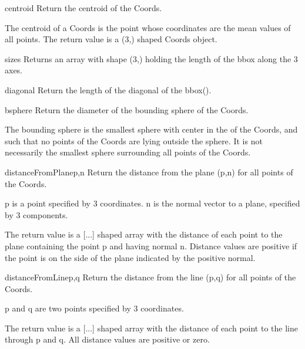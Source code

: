 \begin{methoddesc}{centroid}{}
Return the centroid of the Coords.

        The centroid of a Coords is the point whose coordinates
        are the mean values of all points.
        The return value is a (3,) shaped Coords object.\end{methoddesc}

\begin{methoddesc}{sizes}{}
Returns an array with shape (3,) holding the length of the bbox along the 3 axes.
\end{methoddesc}

\begin{methoddesc}{diagonal}{}
Return the length of the diagonal of the bbox().
\end{methoddesc}

\begin{methoddesc}{bsphere}{}
Return the diameter of the bounding sphere of the Coords.

The bounding sphere is the smallest sphere with center in the  of the Coords, and such that no points of the Coords are lying outside the sphere. It is not necessarily the smallest sphere surrounding all points of the Coords.
\end{methoddesc}


\begin{methoddesc}{distanceFromPlane}{p,n}
    Return the distance from the plane (p,n) for all points of the Coords.

    p is a point specified by 3 coordinates.
    n is the normal vector to a plane, specified by 3 components.

    The return value is a [...] shaped array with the distance of
    each point to the plane containing the point  p and having normal n.
    Distance values are positive if the point is on the side of the
    plane indicated by the positive normal.
\end{methoddesc}


\begin{methoddesc}{distanceFromLine}{p,q}
    Return the distance from the line (p,q) for all points of the Coords.

    p and q are two points specified by 3 coordinates.

    The return value is a [...] shaped array with the distance of
    each point to the line through p and q.
    All distance values are positive or zero.
\end{methoddesc}


